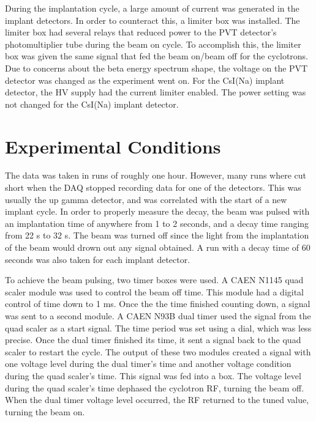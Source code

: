 \documentclass[../MaxHughesThesis.tex]{subfiles}
\begin{document}
During the implantation cycle, a large amount of current was generated in the implant detectors.
In order to counteract this, a limiter box was installed.
The limiter box had several relays that reduced power to the PVT detector's photomultiplier tube during the beam on cycle. 
To accomplish this, the limiter box was given the same signal that fed the beam on/beam off for the cyclotrons.
Due to concerns about the beta energy spectrum shape, the voltage on the PVT detector was changed as the experiment went on. 
For the CsI(Na) implant detector, the HV supply had the current limiter enabled.
The power setting was not changed for the CsI(Na) implant detector. 


\section{Experimental Conditions}
The data was taken in runs of roughly one hour. 
However, many runs where cut short when the DAQ stopped recording data for one of the detectors.
This was usually the up gamma detector, and was correlated with the start of a new implant cycle.
In order to properly measure the decay, the beam was pulsed with an implantation time of anywhere from 1 to 2 seconds, and a decay time ranging from 22 s to 32 s. 
The beam was turned off since the light from the implantation of the beam would drown out any signal obtained. 
A run with a decay time of 60 seconds was also taken for each implant detector. 

To achieve the beam pulsing, two timer boxes were used.
A CAEN N1145 quad scaler module was used to control the beam off time.
This module had a digital control of time down to 1 ms.
Once the the time finished counting down, a signal was sent to a second module. 
A CAEN N93B dual timer used the signal from the quad scaler as a start signal.
The time period was set using a dial, which was less precise. 
Once the dual timer finished its time, it sent a signal back to the quad scaler to restart the cycle.
The output of these two modules created a signal with one voltage level during the dual timer's time and another voltage condition during the quad scaler's time.
This signal was fed into a box.
The voltage level during the quad scaler's time dephased the cyclotron RF, turning the beam off.
When the dual timer voltage level occurred, the RF returned to the tuned value, turning the beam on.  
\end{document}
